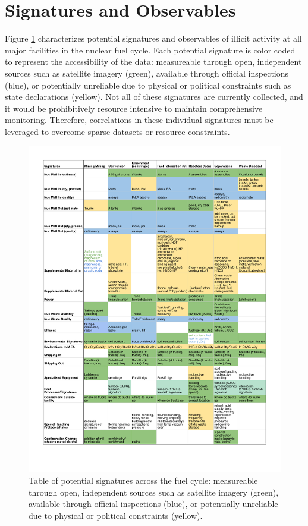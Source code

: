 \section{Signatures and Observables}
\label{s_signatures}


Figure \ref{fig:signatures} characterizes potential signatures and observables of illicit activity at all major facilities in the nuclear fuel cycle.  Each potential signature is color coded to represent the accessibility of the data: measureable through open, independent sources such as satellite imagery (green), available through official inspections (blue), or potentially unreliable due to physical or political constraints such as state declarations (yellow).  Not all of these signatures are currently collected, and it would be prohibitively resource intensive to maintain comprehensive monitoring. Therefore, correlations in these individual signatures must be leveraged to overcome sparse datasets or resource constraints.


\begin{figure}%
\begin{center}
\includegraphics[scale=0.8]{./figs/signatures_table.pdf}
\end{center}
\caption{Table of potential signatures across the fuel cycle: measureable through open, independent sources such as satellite imagery (green), available through official inspections (blue), or potentially unreliable due to physical or political constraints (yellow).\cite{kemp_environmental_2016,_plutonium_????,ferreira_radiometric_2012,stork_systematic_2006}}
\label{fig:signatures}
\end{figure}

